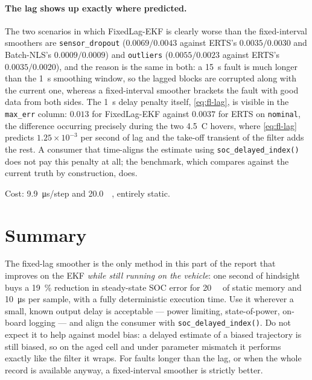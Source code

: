 \paragraph{The lag shows up exactly where predicted.}  The two scenarios in which FixedLag-EKF is
clearly worse than the fixed-interval smoothers are \texttt{sensor\_dropout} ($0.0069/0.0043$
against ERTS's $0.0035/0.0030$ and Batch-NLS's $0.0009/0.0009$) and \texttt{outliers}
($0.0055/0.0023$ against ERTS's $0.0035/0.0020$), and the reason is the same in both: a
\SI{15}{\second} fault is much longer than the \SI{1}{\second} smoothing window, so the lagged blocks
are corrupted along with the current one, whereas a fixed-interval smoother brackets the fault with
good data from both sides.  The \SI{1}{\second} delay penalty itself, \eqref{eq:fl-lag}, is visible
in the \texttt{max\_err} column: $0.013$ for FixedLag-EKF against $0.0037$ for ERTS on
\texttt{nominal}, the difference occurring precisely during the two \SI{4.5}{C} hovers, where
\eqref{eq:fl-lag} predicts $1.25\times10^{-3}$ per second of lag and the take-off transient of the
filter adds the rest.  A
consumer that time-aligns the estimate using \texttt{soc\_delayed\_index()} does not pay this
penalty at all; the benchmark, which compares against the current truth by construction, does.

Cost: \SI{9.9}{\micro\second}/step and \SI{20.0}{\kilo\byte}, entirely static.

\section{Summary}
The fixed-lag smoother is the only method in this part of the report that improves on the EKF
\emph{while still running on the vehicle}: one second of hindsight buys a \SI{19}{\percent}
reduction in steady-state SOC error for \SI{20}{\kilo\byte} of static memory and
\SI{10}{\micro\second} per sample, with a fully deterministic execution time.  Use it wherever a
small, known output delay is acceptable --- power limiting, state-of-power, on-board logging --- and
align the consumer with \texttt{soc\_delayed\_index()}.  Do not expect it to help against model
bias: a delayed estimate of a biased trajectory is still biased, so on the aged cell and under
parameter mismatch it performs exactly like the filter it wraps.  For faults longer than the lag,
or when the whole record is available anyway, a fixed-interval smoother is strictly better.
